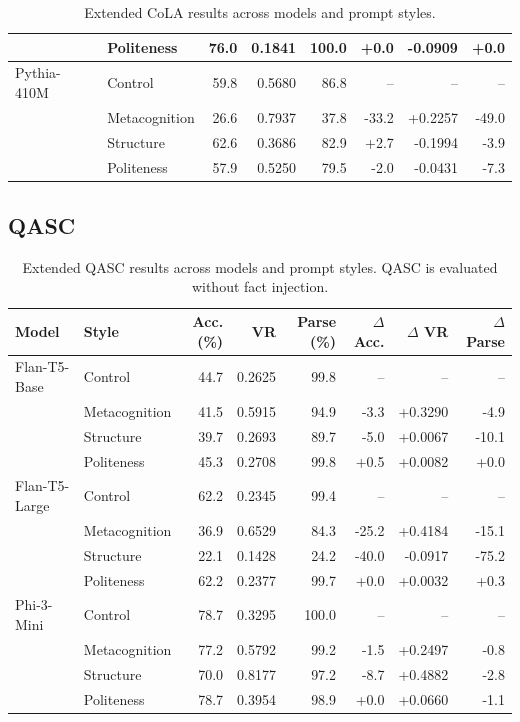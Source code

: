 \documentclass[11pt]{article}
\begin{document}
\begin{table}[h]
\begin{tabular}{llrrrrrr}
 & Politeness & 76.0 & 0.1841 & 100.0 & +0.0 & -0.0909 & +0.0 \\
\midrule
Pythia-410M & Control & 59.8 & 0.5680 & 86.8 & -- & -- & -- \\
 & Metacognition & 26.6 & 0.7937 & 37.8 & -33.2 & +0.2257 & -49.0 \\
 & Structure & 62.6 & 0.3686 & 82.9 & +2.7 & -0.1994 & -3.9 \\
 & Politeness & 57.9 & 0.5250 & 79.5 & -2.0 & -0.0431 & -7.3 \\
\bottomrule
\end{tabular}
\caption{Extended CoLA results across models and prompt styles.}
\label{tab:app-cola-results}
\end{table}

\subsection{QASC}

\begin{table}[h]
\centering
\small
\setlength{\tabcolsep}{5pt}
\begin{tabular}{llrrrrrr}
\toprule
Model & Style & Acc. (\%) & VR & Parse (\%) & $\Delta$ Acc. & $\Delta$ VR & $\Delta$ Parse \\
\midrule
Flan-T5-Base & Control & 44.7 & 0.2625 & 99.8 & -- & -- & -- \\
 & Metacognition & 41.5 & 0.5915 & 94.9 & -3.3 & +0.3290 & -4.9 \\
 & Structure & 39.7 & 0.2693 & 89.7 & -5.0 & +0.0067 & -10.1 \\
 & Politeness & 45.3 & 0.2708 & 99.8 & +0.5 & +0.0082 & +0.0 \\
\midrule
Flan-T5-Large & Control & 62.2 & 0.2345 & 99.4 & -- & -- & -- \\
 & Metacognition & 36.9 & 0.6529 & 84.3 & -25.2 & +0.4184 & -15.1 \\
 & Structure & 22.1 & 0.1428 & 24.2 & -40.0 & -0.0917 & -75.2 \\
 & Politeness & 62.2 & 0.2377 & 99.7 & +0.0 & +0.0032 & +0.3 \\
\midrule
Phi-3-Mini & Control & 78.7 & 0.3295 & 100.0 & -- & -- & -- \\
 & Metacognition & 77.2 & 0.5792 & 99.2 & -1.5 & +0.2497 & -0.8 \\
 & Structure & 70.0 & 0.8177 & 97.2 & -8.7 & +0.4882 & -2.8 \\
 & Politeness & 78.7 & 0.3954 & 98.9 & +0.0 & +0.0660 & -1.1 \\
\bottomrule
\end{tabular}
\caption{Extended QASC results across models and prompt styles. QASC is evaluated without fact injection.}
\label{tab:app-qasc-results}
\end{table}
\end{document}
